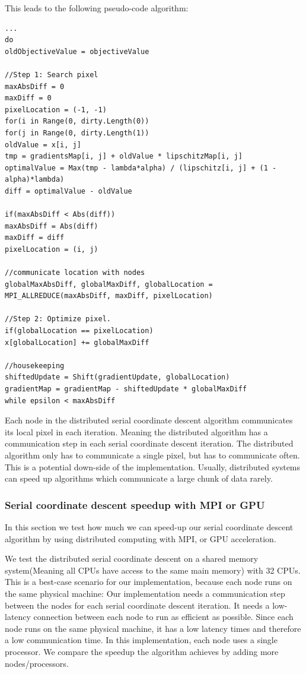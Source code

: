 This leads to the following pseudo-code algorithm:
\begin{lstlisting}
...
do 
oldObjectiveValue = objectiveValue

//Step 1: Search pixel
maxAbsDiff = 0
maxDiff = 0
pixelLocation = (-1, -1)
for(i in Range(0, dirty.Length(0))
for(j in Range(0, dirty.Length(1))
oldValue = x[i, j]
tmp = gradientsMap[i, j] + oldValue * lipschitzMap[i, j]
optimalValue = Max(tmp - lambda*alpha) / (lipschitz[i, j] + (1 - alpha)*lambda)
diff = optimalValue - oldValue

if(maxAbsDiff < Abs(diff))
maxAbsDiff = Abs(diff)
maxDiff = diff
pixelLocation = (i, j)

//communicate location with nodes
globalMaxAbsDiff, globalMaxDiff, globalLocation = MPI_ALLREDUCE(maxAbsDiff, maxDiff, pixelLocation)

//Step 2: Optimize pixel.
if(globalLocation == pixelLocation)
x[globalLocation] += globalMaxDiff

//housekeeping
shiftedUpdate = Shift(gradientUpdate, globalLocation)
gradientMap = gradientMap - shiftedUpdate * globalMaxDiff
while epsilon < maxAbsDiff
\end{lstlisting}

Each node in the distributed serial coordinate descent algorithm communicates its local pixel in each iteration. Meaning the distributed algorithm has a communication step in each serial coordinate descent iteration. The distributed algorithm only has to communicate a single pixel, but has to communicate often. This is a potential down-side of the implementation. Usually, distributed systems can speed up algorithms which communicate a large chunk of data rarely.

\subsubsection*{Serial coordinate descent speedup with MPI or GPU}\label{results:speedup}
In this section we test how much we can speed-up our serial coordinate descent algorithm by using distributed computing with MPI, or GPU acceleration.

We test the distributed serial coordinate descent on a shared memory system(Meaning all CPUs have access to the same main memory) with 32 CPUs. This is a best-case scenario for our implementation, because each node runs on the same physical machine: Our implementation needs a communication step between the nodes for each serial coordinate descent iteration. It needs a low-latency connection between each node to run as efficient as possible. Since each node runs on the same physical machine, it has a low latency times and therefore a low communication time. In this implementation, each node uses a single processor. We compare the speedup the algorithm achieves by adding more nodes/processors.

